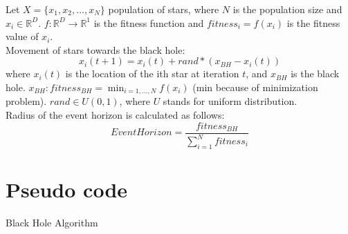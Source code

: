 \documentclass[border=0.2cm]{report}
\newcommand{\R}{\mathbb{R}} %
\begin{document}
\noindent
Let $X=\{x_1,x_2,\ldots,x_N\}$ population of stars, where $N$ is the population size and $x_i \in \R^D$.
$f: \R^{D}\to\R^1$ is the fitness function and $fitness_i=f(x_i)$ is the fitness value of $x_i$.\\
\noindent
Movement of stars towards the black hole:
\begin{equation}\label{eqn_bha_step}
x_i(t+1)=x_i(t)+rand*(x_{BH}-x_i(t))
\end{equation}
where $x_i(t)$ is the location of the ith star at iteration $t$, and $x_{BH}$ is the black hole. $x_{BH}: fitness_{BH}=\displaystyle \min_{i=1,\dots, N}f(x_i)$ (min because of minimization problem). $rand \in U(0, 1)$, where $U$ stands for uniform distribution.\\
\noindent
Radius of the event horizon is calculated as follows:
\begin{equation}\label{eqn_bha_event_horizon}
Event Horizon=\frac{fitness_{BH}}{\sum\limits_{i=1}^N fitness_i}
\end{equation}



\section{Pseudo code}

\begin{algorithm}[H]
\caption{Black Hole Algorithm}
 
\end{algorithm}
\end{document}
